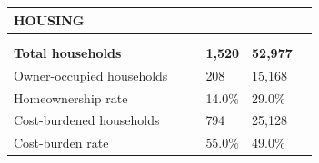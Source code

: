 \documentclass[9pt]{report}
\begin{document}
\vspace{12pt}
\setlength{\tabcolsep}{.01in} %
\begin{tabular}{p{.10in}p{.10in}p{.10in}p{3.7in}>{\hfill}p{.85in}>{\hfill}p{.85in}>{\hfill}p{.85in}>{\hfill}p{.85in}p{0.1in}}
\multicolumn{9}{l}{\parbox{7.1in}{\raggedright{\large{\strut\textbf{HOUSING}\strut}}}} \\ 
\hline
\multicolumn{4}{l}{\parbox{3.5in}{\raggedright{\textbf{}}}} & \multicolumn{1}{r}{\parbox{.85in}{\strut\raggedleft{\textbf{}\strut}}} & \multicolumn{1}{r}{\parbox{.85in}{\strut\raggedleft{\textbf{}\strut}}} & \multicolumn{1}{r}{\parbox{.85in}{\strut{}}} & \multicolumn{1}{r}{\parbox{.85in}{\strut{}}} & \\ 
\multicolumn{9}{l}{} \\ 
\multicolumn{4}{l}{\parbox{3.5in}{\strut\raggedright{\textbf{Total households}\strut}}} & \textbf{} & \textbf{} & \textbf{1,520} & \textbf{52,977} & \textbf{} \\ 
\multicolumn{4}{l}{\parbox{3.6in}{\strut\raggedright{{Owner-occupied households}}\strut}} &  &  & 208 & 15,168 & \multicolumn{1}{l}{}  \\ 
\multicolumn{4}{l}{\parbox{3.6in}{\strut\raggedright{{Homeownership rate}}\strut}} &  &  & 14.0\% & 29.0\% & \multicolumn{1}{l}{}  \\ 
\multicolumn{4}{l}{\parbox{3.6in}{\strut\raggedright{{Cost-burdened households}}\strut}} &  &  & 794 & 25,128 & \multicolumn{1}{l}{}  \\ 
\multicolumn{4}{l}{\parbox{3.6in}{\strut\raggedright{{Cost-burden rate}}\strut}} &  &  & 55.0\% & 49.0\% & \multicolumn{1}{l}{}  \\ 

\end{tabular}
\setlength{\tabcolsep}{6pt} %
\end{document}

